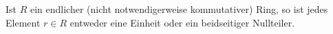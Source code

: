 \begin{itemize}
    \begin{corollary}
      Ist $R$ ein endlicher \textup(nicht notwendigerweise kommutativer\textup) Ring, so ist jedes Element $r \in R$ entweder eine Einheit oder ein beidseitiger Nullteiler.
    \end{corollary}
    
\end{itemize}





\addtocounter{subsection}{1}





\addtocounter{subsection}{1}





\addtocounter{subsection}{1}





\addtocounter{subsection}{1}





\addtocounter{subsection}{1}




